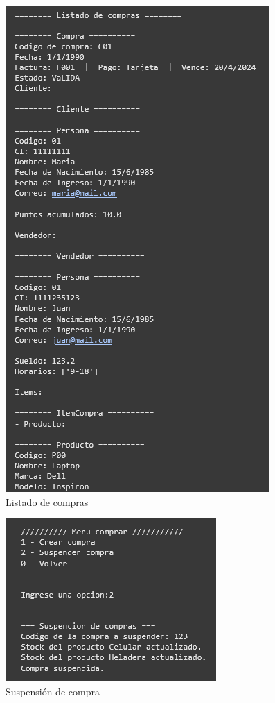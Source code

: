 \documentclass[11pt]{article}
\begin{document}
\begin{multicols}{2}
\begin{figure}[H]
    \centering
    \includegraphics[width=0.5\linewidth]{./anexos/evidencias/listadoCompra.png}
    \caption{Listado de compras}
    \label{fig:listadoCompra}
\end{figure}

\begin{figure}[H]
    \centering
    \includegraphics[width=0.5\linewidth]{./anexos/evidencias/suspenderCompra.png}
    \caption{Suspensión de compra}
    \label{fig:suspenderCompra}
\end{figure}


\end{multicols}
\end{document}
